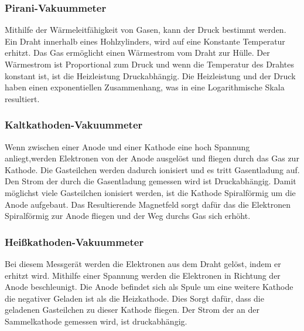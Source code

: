 \subsubsection{Pirani-Vakuummeter}
Mithilfe der Wärmeleitfähigkeit von Gasen, kann der Druck bestimmt werden. Ein Draht innerhalb eines Hohlzylinders, wird auf eine Konstante Temperatur erhitzt. Das Gas ermöglicht einen Wärmestrom vom Draht zur Hülle. Der Wärmestrom ist Proportional zum Druck und wenn die Temperatur des Drahtes konstant ist, ist die Heizleistung Druckabhängig. Die Heizleistung und der Druck haben einen exponentiellen Zusammenhang, was in eine Logarithmische Skala resultiert.
\subsubsection{Kaltkathoden-Vakuummeter}
Wenn zwischen einer Anode und einer Kathode eine hoch Spannung anliegt,werden Elektronen von der Anode ausgelöst und fliegen durch das Gas zur Kathode. Die Gasteilchen werden dadurch ionisiert und es tritt Gasentladung auf. Den Strom der durch die Gasentladung gemessen wird ist Druckabhängig. Damit möglichst viele Gasteilchen ionisiert werden, ist die Kathode Spiralförmig um die Anode aufgebaut. Das Resultierende Magnetfeld sorgt dafür das die Elektronen Spiralförmig zur Anode fliegen und der Weg durchs Gas sich erhöht.
\subsubsection{Heißkathoden-Vakuummeter}
Bei diesem Messgerät werden die Elektronen aus dem Draht gelöst, indem er erhitzt wird. Mithilfe einer Spannung werden die Elektronen in Richtung der Anode beschleunigt. Die Anode befindet sich als Spule um eine weitere Kathode die negativer Geladen ist als die Heizkathode. Dies Sorgt dafür, dass die geladenen Gasteilchen zu dieser Kathode fliegen. Der Strom der an der Sammelkathode gemessen wird, ist druckabhängig.